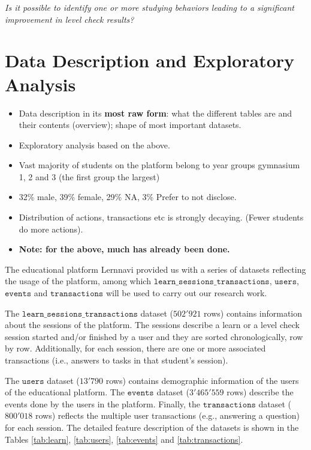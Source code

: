 \documentclass[sigplan,screen]{acmart}
\begin{document}
\begin{displayquote}
\textit{Is it possible to identify one or more studying behaviors leading to a significant improvement in level check results?}
\end{displayquote}



\section{Data Description and Exploratory Analysis}\label{sec:data}

{\color{red}
\begin{itemize}
    \item Data description in its \textbf{most raw form}: what the different tables are and their contents (overview); shape of most important datasets.
    \item Exploratory analysis based on the above.
    \item Vast majority of students on the platform belong to year groups gymnasium 1, 2 and 3 (the first group the largest)
    \item 32\% male, 39\% female, 29\% NA, 3\% Prefer to not disclose. 
    \item Distribution of actions, transactions etc is strongly decaying. (Fewer students do more actions).  
    \item \textbf{Note: for the above, much has already been done.} 
\end{itemize}
}

The educational platform Lernnavi provided us with a series of datasets reflecting the usage of the platform, among which $\texttt{learn\_sessions\_transactions}$, $\texttt{users}$, $\texttt{events}$ and $\texttt{transactions}$ will be used to carry out our research work.

The $\texttt{learn\_sessions\_transactions}$ dataset ($502'921$ rows) contains information about the sessions of the platform. The sessions describe a learn or a level check session started and/or finished by a user and they are sorted chronologically, row by row. Additionally, for each session, there are one or more associated transactions (i.e., answers to tasks in that student's session).

The $\texttt{users}$ dataset ($13'790$ rows) contains demographic information of the users of the educational platform. The $\texttt{events}$ dataset ($3'465'559$ rows) describe the events done by the users in the platform. Finally, the $\texttt{transactions}$ dataset ($800'018$ rows) reflects the multiple user transactions (e.g., answering a question) for each session. The detailed feature description of the datasets is shown in the Tables \ref{tab:learn}, \ref{tab:users}, \ref{tab:events} and \ref{tab:transactions}.
\end{document}
